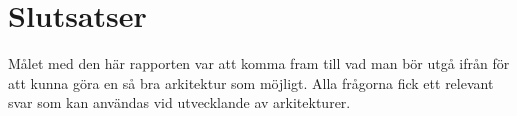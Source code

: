 \section{Slutsatser}
Målet med den här rapporten var att komma fram till vad man bör utgå ifrån för att kunna göra en så bra arkitektur som möjligt. Alla frågorna fick ett relevant svar som kan användas vid utvecklande av arkitekturer.

